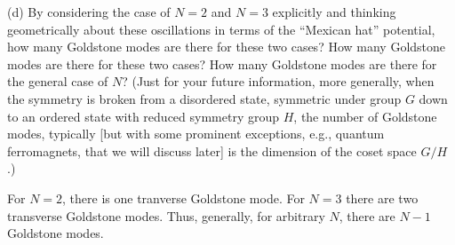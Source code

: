 \documentclass[12pt]{article}
\begin{document}
\begin{problem}{4}
(d) By considering the case of $N=2$ and $N=3$ explicitly and thinking
geometrically about these oscillations in terms of the ``Mexican hat''
potential, how many Goldstone modes are there for these two cases? How many
Goldstone modes are there for these two cases? How many Goldstone modes are
there for the general case of $N$? (Just for your future information, more
generally, when the symmetry is broken from a disordered state, symmetric under
group $G$ down to an ordered state with reduced symmetry group $H$, the number
of Goldstone modes, typically [but with some prominent exceptions, e.g.,
quantum ferromagnets, that we will discuss later] is the dimension of the coset
space $G/H$.)
\begin{solution}
For $N=2$, there is one tranverse Goldstone mode. For $N=3$ there are two
transverse Goldstone modes. Thus, generally, for arbitrary $N$, there are $N-1$
Goldstone modes.
\end{solution}
\end{problem}
\newpage
\end{document}
